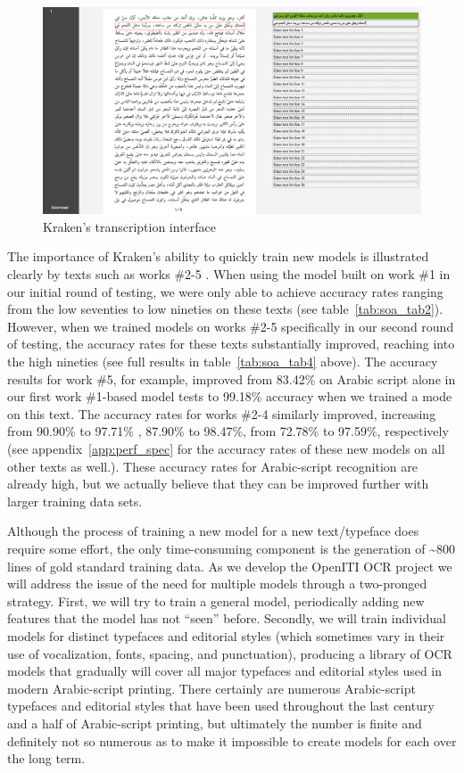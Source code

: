 \begin{figure}
        \centering
        \includegraphics[width=\textwidth]{images/image10.png}
	\caption{Kraken’s transcription interface}
	\label{fig:soa_1}
\end{figure}


The importance of Kraken’s ability to quickly train new models is illustrated
clearly by texts such as works \#2-5 . When using the model built on work \#1 in
our initial round of testing, we were only able to achieve accuracy rates
ranging from the low seventies to low nineties on these texts (see table~\ref{tab:soa_tab2}).
However, when we trained models on works \#2-5 specifically in our second round
of testing, the accuracy rates for these texts substantially improved, reaching
into the high nineties (see full results in table~\ref{tab:soa_tab4} above). The accuracy
results for work \#5, for example, improved from 83.42\% on Arabic script alone
in our first work \#1-based model tests to 99.18\% accuracy when we trained a
mode on this text. The accuracy rates for works \#2-4 similarly improved,
increasing from 90.90\% to 97.71\% , 87.90\% to 98.47\%, from 72.78\% to
97.59\%, respectively (see appendix~\ref{app:perf_spec} for the accuracy rates
of these new models on all other texts as well.). These accuracy rates for
Arabic-script recognition are already high, but we actually believe that they
can be improved further with larger training data sets.

Although the process of training a new model for a new text/typeface does
require some effort, the only time-consuming component is the generation of
\textasciitilde800 lines of gold standard training data. As we develop the OpenITI OCR
project we will address the issue of the need for multiple models through a
two-pronged strategy. First, we will try to train a general model, periodically
adding new features that the model has not “seen” before. Secondly, we will
train individual models for distinct typefaces and editorial styles (which
sometimes vary in their use of vocalization, fonts, spacing, and punctuation),
producing a library of OCR models that gradually will cover all major typefaces
and editorial styles used in modern Arabic-script printing. There certainly are
numerous Arabic-script typefaces and editorial styles that have been used
throughout the last century and a half of Arabic-script printing, but
ultimately the number is finite and definitely not so numerous as to make it
impossible to create models for each over the long term.  


